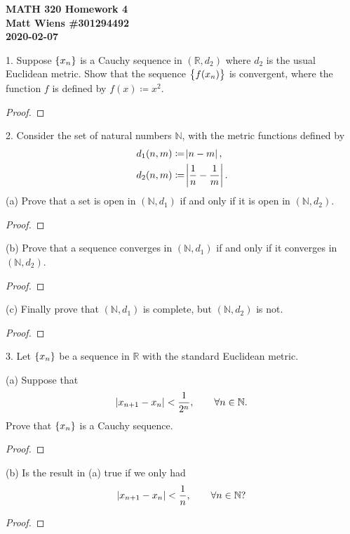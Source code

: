 \documentclass{article}
\newcommand{\N}{\mathbb{N}}
\newcommand{\R}{\mathbb{R}}
\begin{document}
\textbf{MATH 320 Homework 4} \\
\textbf{Matt Wiens \#301294492} \\
\textbf{2020-02-07}

1. Suppose $\cbr{x_n}$ is a Cauchy sequence in $(\R, d_2)$ where $d_2$ is
the usual Euclidean metric. Show that the sequence $\cbr{f(x_n)}$ is
convergent, where the function $f$ is defined by $f(x) \coloneqq x^2$.

\begin{proof}

\end{proof}

\newpage

2. Consider the set of natural numbers $\N$, with the metric functions
defined by
%
\begin{align*}
    d_1(n, m) &\coloneqq \envert{n - m}, \\
    d_2(n, m) &\coloneqq \envert{\frac{1}{n} - \frac{1}{m}}.
\end{align*}
%
(a) Prove that a set is open in $(\N, d_1)$ if and only if it is open in
$(\N, d_2)$.

\begin{proof}

\end{proof}

(b) Prove that a sequence converges in $(\N, d_1)$ if and only if it converges in $ (\N, d_2)$.

\begin{proof}

\end{proof}

(c) Finally prove that $(\N, d_1)$ is complete, but $(\N, d_2)$ is not.

\begin{proof}

\end{proof}

\newpage

3. Let $\cbr{x_n}$ be a sequence in $\R$ with the standard Euclidean metric.

(a) Suppose that
%
\begin{equation*}
    \envert{x_{n+1} - x_n} < \frac{1}{2^n}, \qquad \forall n \in \N
    .
\end{equation*}
%
Prove that $\cbr{x_n}$ is a Cauchy sequence.

\begin{proof}

\end{proof}

(b) Is the result in (a) true if we only had
%
\begin{equation*}
    \envert{x_{n+1} - x_n} < \frac{1}{n}, \qquad \forall n \in \N
    ?
\end{equation*}

\begin{proof}

\end{proof}
\end{document}
